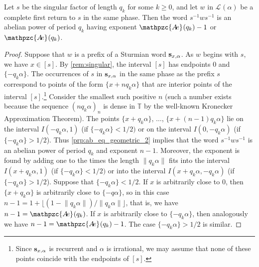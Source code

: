 \documentclass[a4paper,fleqn]{article}
\providecommand{\norm}[1]{\lVert#1\rVert}
\providecommand{\floor}[1]{\lfloor#1\rfloor}
\newcommand{\Lang}[2][]{\mathcal{L}_{#1}(#2)}
\newcommand{\infw}[1]{%
  \ifcat\noexpand#1\relax\bm{#1}%
  \else\mathbf{#1}\fi}          %
\newcommand{\abexp}[2][]{\mathpzc{A\mkern-3mu e}_{#1}(#2)}
\newcommand{\T}{\mathbb{T}}
\begin{document}
  \begin{lemma}\label{lem:covering}
    Let $s$ be the singular factor of length $q_k$ for some $k \geq 0$, and let $w$ in $\Lang{\alpha}$ be a complete
    first return to $s$ in the same phase. Then the word $s^{-1}ws^{-1}$ is an abelian power of period $q_k$ having
    exponent $\abexp{q_k} - 1$ or $\abexp{q_k}$.
  \end{lemma}
  \begin{proof}
    Suppose that $w$ is a prefix of a Sturmian word $\infw{s}_{x,\alpha}$. As $w$ begins with $s$, we have $x \in [s]$.
    By \autoref{rem:singular}, the interval $[s]$ has endpoints $0$ and $\{-q_k\alpha\}$. The occurrences of $s$ in
    $\infw{s}_{x,\alpha}$ in the same phase as the prefix $s$ correspond to points of the form $\{x + nq_k \alpha\}$
    that are interior points of the interval $[s]$.\footnote{Since $\infw{s}_{x,\alpha}$ is recurrent and $\alpha$ is
    irrational, we may assume that none of these points coincide with the endpoints of $[s]$.} Consider the smallest
    such positive $n$ (such a number exists because the sequence $(nq_k\alpha)_n$ is dense in $\T$ by the well-known
    Kronecker Approximation Theorem). The points $\{x + q_k\alpha\}$, $\ldots$, $\{x + (n - 1)q_k\alpha\}$ lie on the
    interval $I(-q_k\alpha, 1)$ (if $\{-q_k\alpha\} < 1/2)$ or on the interval $I(0, -q_k\alpha)$ (if
    $\{-q_k\alpha\} > 1/2$). Thus \autoref{prp:ab_eq_geometric_2} implies that the word $s^{-1}ws^{-1}$ is an abelian
    power of period $q_k$ and exponent $n - 1$. Moreover, the exponent is found by adding one to the times the length
    $\norm{q_k\alpha}$ fits into the interval $I(x + q_k\alpha, 1)$ (if $\{-q_k\alpha\} < 1/2)$ or into the interval
    $I(x + q_k\alpha, -q_k\alpha)$ (if $\{-q_k\alpha\} > 1/2$). Suppose that $\{-q_k\alpha\} < 1/2$. If $x$ is
    arbitrarily close to $0$, then $\{x + q_k\alpha\}$ is arbitrarily close to $\{-q\alpha\}$, so in this case
    $n - 1 = 1 + \floor{(1 - \norm{q_k\alpha})/\norm{q_k\alpha}}$, that is, we have $n - 1 = \abexp{q_k}$. If $x$ is
    arbitrarily close to $\{-q_k\alpha\}$, then analogously we have $n - 1 = \abexp{q_k} - 1$. The case
    $\{-q_k\alpha\} > 1/2$ is similar.
  \end{proof}
\end{document}
